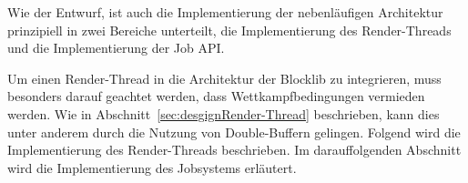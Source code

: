 Wie der Entwurf, ist auch die Implementierung der nebenläufigen Architektur prinzipiell in zwei Bereiche unterteilt, die Implementierung des Render-Threads und die Implementierung der Job API.

Um einen Render-Thread in die Architektur der Blocklib zu integrieren, muss besonders darauf geachtet werden, dass Wettkampfbedingungen vermieden werden. Wie in Abschnitt~\ref{sec:desgignRender-Thread} beschrieben, kann dies unter anderem durch die Nutzung von Double-Buffern gelingen. Folgend wird die Implementierung des Render-Threads beschrieben. Im darauffolgenden Abschnitt wird die Implementierung des Jobsystems erläutert.